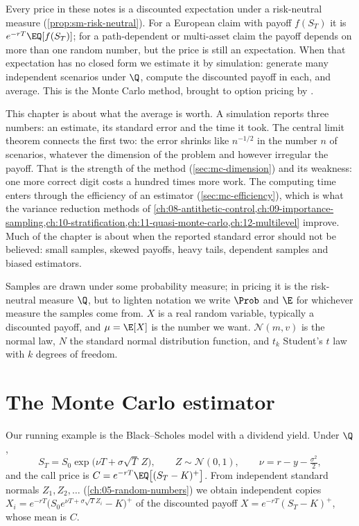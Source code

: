
Every price in these notes is a discounted expectation under a risk-neutral measure
(\cref{prop:sm-risk-neutral}). For a European claim with payoff $f(S_T)$ it is
$e^{-rT}\EQ[f(S_T)]$; for a path-dependent or multi-asset claim the payoff depends on more
than one random number, but the price is still an expectation. When that expectation has no
closed form we estimate it by simulation: generate many independent scenarios under $\Q$,
compute the discounted payoff in each, and average. This is the Monte Carlo method,
brought to option pricing by \textcite{boyle-mc}.

This chapter is about what the average is worth. A simulation reports three numbers: an
estimate, its standard error and the time it took. The central limit theorem connects the
first two: the error shrinks like $n^{-1/2}$ in the number $n$ of scenarios, whatever the
dimension of the problem and however irregular the payoff. That is the strength of the
method (\cref{sec:mc-dimension}) and its weakness: one more correct digit costs a hundred
times more work. The computing time enters through the efficiency of an estimator
(\cref{sec:mc-efficiency}), which is what the variance reduction methods of
\cref{ch:08-antithetic-control,ch:09-importance-sampling,ch:10-stratification,ch:11-quasi-monte-carlo,ch:12-multilevel}
improve. Much of the chapter is about when the reported standard error should not be
believed: small samples, skewed payoffs, heavy tails, dependent samples and biased
estimators.

Samples are drawn under some probability measure; in pricing it is the risk-neutral
measure $\Q$, but to lighten notation we write $\Prob$ and $\E$ for whichever measure the
samples come from. $X$ is a real random variable, typically a discounted payoff, and
$\mu=\E[X]$ is the number we want. $\mathcal N(m,v)$ is the normal law, $N$ the standard
normal distribution function, and $t_k$ Student's $t$ law with $k$ degrees of freedom.

\section{The Monte Carlo estimator}\label{sec:mc-estimator}

Our running example is the Black--Scholes model with a dividend yield. Under $\Q$,
\begin{equation}\label{eq:mc-gbm}
  S_T=S_0\exp\big(\nu T+\sigma\sqrt T\,Z\big),\qquad Z\sim\mathcal N(0,1),\qquad
  \nu=r-y-\tfrac{\sigma^2}{2},
\end{equation}
and the call price is $C=e^{-rT}\EQ\big[(S_T-K)^+\big]$. From independent standard normals
$Z_1,Z_2,\dots$ (\cref{ch:05-random-numbers}) we obtain independent copies
$X_i=e^{-rT}\big(S_0e^{\nu T+\sigma\sqrt TZ_i}-K\big)^+$ of the discounted payoff
$X=e^{-rT}(S_T-K)^+$, whose mean is $C$.

